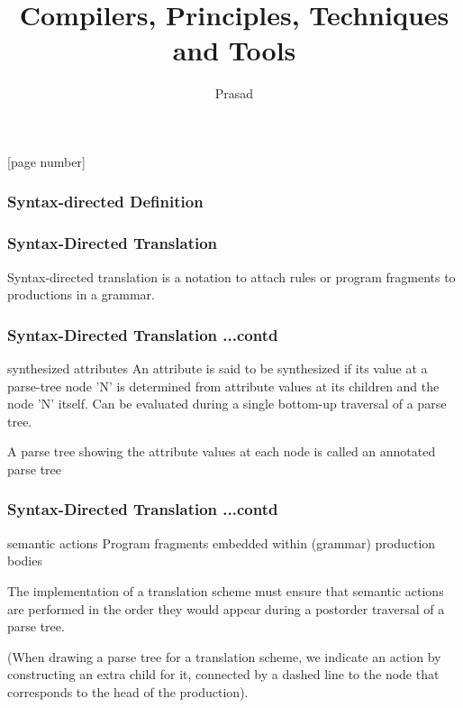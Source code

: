 \documentclass[12]{beamer}
\title{Compilers, Principles, Techniques and Tools}
\author{Prasad}
\date
\begin{document}
\maketitle

[page number]{}

\begin{frame}
\frametitle{Syntax-directed Definition}

\end{frame}

\begin{frame}
\frametitle{Syntax-Directed Translation}

Syntax-directed translation is a notation to attach rules or program fragments to productions in a grammar. 

\end{frame}

%
%
\begin{frame}
\frametitle{Syntax-Directed Translation ...contd}

\begin{block}{synthesized attributes}
An attribute is said to be synthesized if its value at a parse-tree node 'N' is determined from attribute values at its children and the node 'N' itself. Can be evaluated during a single bottom-up traversal of a parse tree.
\end{block}

A parse tree showing the attribute values at each node is called an annotated parse tree
\end{frame}

%
%
\begin{frame}
\frametitle{Syntax-Directed Translation ...contd}
\begin{block}{semantic actions}
Program fragments embedded within (grammar) production bodies
\end{block}

The implementation of a translation scheme must ensure that semantic actions are performed in the order they would appear during a postorder traversal of a parse tree.

(When drawing a parse tree for a translation scheme, we indicate an action by constructing an extra child for it, connected by a dashed line to the node that corresponds to the head of the production).

\end{frame}
\end{document}
